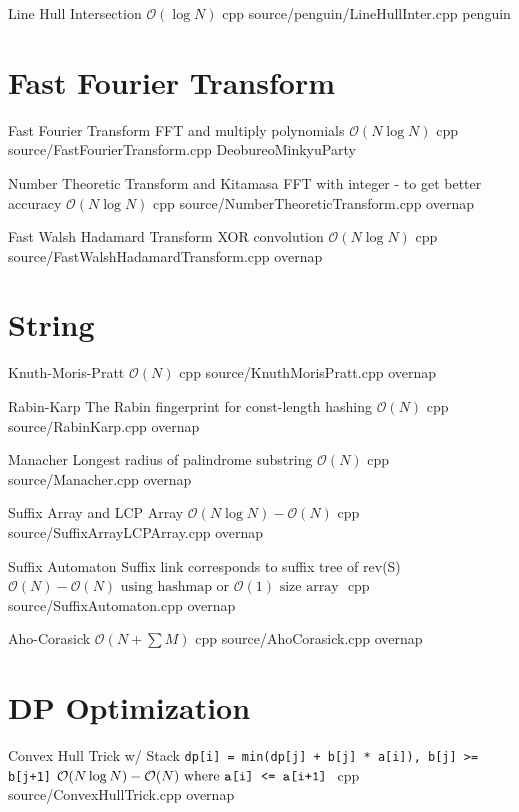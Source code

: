 \documentclass[landscape, 10pt, a4paper, oneside, twocolumn]{extarticle}
\begin{document}
\Algorithm
{Line Hull Intersection}
{}
{$\mathcal{O}(\log{N})$}
{cpp}
{source/penguin/LineHullInter.cpp}
{penguin}


\section{Fast Fourier Transform}

\Algorithm
{Fast Fourier Transform}
{FFT and multiply polynomials}
{$\mathcal{O}(N\log{N})$}
{cpp}
{source/FastFourierTransform.cpp}
{DeobureoMinkyuParty}

\Algorithm
{Number Theoretic Transform and Kitamasa}
{FFT with integer - to get better accuracy}
{$\mathcal{O}(N\log{N})$}
{cpp}
{source/NumberTheoreticTransform.cpp}
{overnap}

\Algorithm
{Fast Walsh Hadamard Transform}
{XOR convolution}
{$\mathcal{O}(N\log{N})$}
{cpp}
{source/FastWalshHadamardTransform.cpp}
{overnap}

\section{String}

\Algorithm
{Knuth-Moris-Pratt}
{}
{$\mathcal{O}(N)$}
{cpp}
{source/KnuthMorisPratt.cpp}
{overnap}

\Algorithm
{Rabin-Karp}
{The Rabin fingerprint for const-length hashing}
{$\mathcal{O}(N)$}
{cpp}
{source/RabinKarp.cpp}
{overnap}

\Algorithm
{Manacher}
{Longest radius of palindrome substring}
{$\mathcal{O}(N)$}
{cpp}
{source/Manacher.cpp}
{overnap}

\Algorithm
{Suffix Array and LCP Array}
{}
{$\mathcal{O}(N\log{N})-\mathcal{O}(N)$}
{cpp}
{source/SuffixArrayLCPArray.cpp}
{overnap}

\Algorithm
{Suffix Automaton}
{Suffix link corresponds to suffix tree of rev(S)}
{$\mathcal{O}(N)-\mathcal{O}(N)\text{ using hashmap or $\mathcal{O}(1)$ size array }$}
{cpp}
{source/SuffixAutomaton.cpp}
{overnap}

\Algorithm
{Aho-Corasick}
{}
{$\mathcal{O}(N+\sum{M})$}
{cpp}
{source/AhoCorasick.cpp}
{overnap}


\section{DP Optimization}

\Algorithm
{Convex Hull Trick w/ Stack}
{\texttt{dp[i] = min(dp[j] + b[j] * a[i]), b[j] >= b[j+1]}}
{$\mathcal{O}(N\log{N})-\mathcal{O}(N)\text{ where \texttt{a[i] <= a[i+1]} }$}
{cpp}
{source/ConvexHullTrick.cpp}
{overnap}
\end{document}
